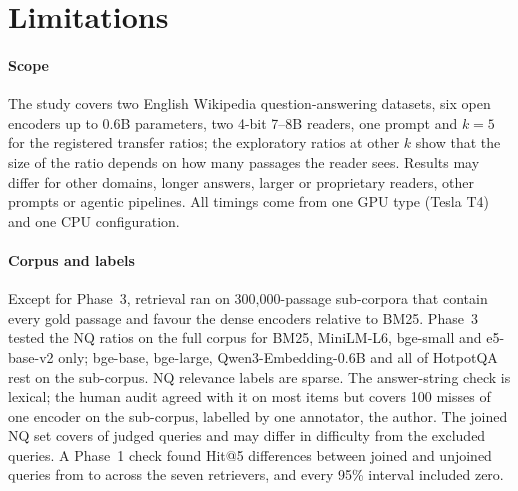 \section{Limitations}\label{sec:limits}

\paragraph{Scope}
The study covers two English Wikipedia question-answering datasets, six open encoders up to 0.6B parameters, two 4-bit 7--8B readers, one prompt and $k=5$ for the registered transfer ratios; the exploratory ratios at other $k$ show that the size of the ratio depends on how many passages the reader sees. Results may differ for other domains, longer answers, larger or proprietary readers, other prompts or agentic pipelines. All timings come from one GPU type (Tesla T4) and one CPU configuration.

\paragraph{Corpus and labels}
Except for Phase~3, retrieval ran on 300,000-passage sub-corpora that contain every gold passage and favour the dense encoders relative to BM25. Phase~3 tested the NQ ratios on the full corpus for BM25, MiniLM-L6, bge-small and e5-base-v2 only; bge-base, bge-large, Qwen3-Embedding-0.6B and all of HotpotQA rest on the sub-corpus. NQ relevance labels are sparse. The answer-string check is lexical; the human audit agreed with it on most items but covers 100 misses of one encoder on the sub-corpus, labelled by one annotator, the author. The joined NQ set covers  of  judged queries and may differ in difficulty from the excluded queries. A Phase~1 check found Hit@5 differences between joined and unjoined queries from  to  across the seven retrievers, and every 95\% interval included zero.

